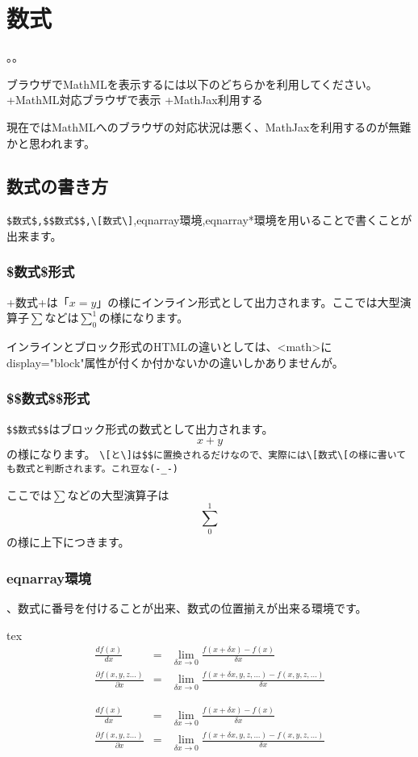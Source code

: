 \chapter{数式}
。。

ブラウザでMathMLを表示するには以下のどちらかを利用してください。
+MathML対応ブラウザで表示
+MathJax利用する

現在ではMathMLへのブラウザの対応状況は悪く、MathJaxを利用するのが無難かと思われます。


\chapternav

\section{数式の書き方}

\verb+$数式$,$$数式$$,\[数式\]+,eqnarray環境,eqnarray*環境を用いることで書くことが出来ます。

\subsection{\$数式\$形式}
\varb+$数式$+は「$x=y$」の様にインライン形式として出力されます。ここでは大型演算子$\sum$などは$\sum_0^1$の様になります。

インラインとブロック形式のHTMLの違いとしては、<math>にdisplay="block"属性が付くか付かないかの違いしかありませんが。

\subsection{\$\$数式\$\$形式}
\verb+$$数式$$+はブロック形式の数式として出力されます。$$x+y$$の様になります。
\verb+\[と\]は+\verb+$$に置換されるだけなので、実際には\[数式\[の様に書いても数式と判断されます。これ豆な(-_-)+

ここでは$\sum$などの大型演算子は$$\sum_0^1$$の様に上下につきます。

\subsection{eqnarray環境}
、数式に番号を付けることが出来、数式の位置揃えが出来る環境です。

\begin{code}{tex}
\begin{eqnarray}
  \label{eq:微分の定義}
  \frac{df(x)}{dx} &=&\lim_{\delta x\to0}\frac{f(x+\delta x)-f(x)}{\delta x}\\
  \label{eq:偏微分の定義}
  \frac{\partial f(x,y,z...)}{\partial x}&=&
  \lim_{\delta x\to0}\frac{f(x+\delta x,y,z,...)-f(x,y,z,...)}{\delta x}
\end{eqnarray}
\end{code}
\begin{eqnarray}
  \label{eq:微分の定義}
  \frac{df(x)}{dx} &=&\lim_{\delta x\to0}\frac{f(x+\delta x)-f(x)}{\delta x}\\
  \label{eq:偏微分の定義}
  \frac{\partial f(x,y,z...)}{\partial x}&=&
  \lim_{\delta x\to0}\frac{f(x+\delta x,y,z,...)-f(x,y,z,...)}{\delta x}
\end{eqnarray}

